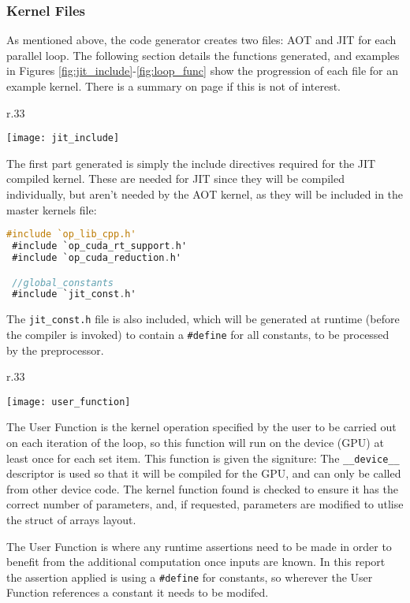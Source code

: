 \subsubsection{Kernel Files}
\label{ss:krnl_files}
As mentioned above, the code generator creates two files: AOT and JIT for each parallel loop. The following section details the functions generated, and examples in Figures \ref{fig:jit_include}-\ref{fig:loop_func} show the progression of each file for an example kernel. There is a summary on page \pageref{impl_summary} if this is not of interest.

%
\begin{wrapfigure}[10]{r}{.33\textwidth}
  \vspace{-2em}
  \centering
  \caption{JIT includes}
  \label{fig:jit_include}
  \texttt{[image: jit\_include]}
\end{wrapfigure}
The first part generated is simply the include directives required for the JIT compiled kernel. These are needed for JIT since they will be compiled individually, but aren't needed by the AOT kernel, as they will be included in the master kernels file:
\begin{lstlisting}[backgroundcolor = \color{green!20}, language=C]
 #include `op_lib_cpp.h'
 #include `op_cuda_rt_support.h'
 #include `op_cuda_reduction.h'

 //global_constants
 #include `jit_const.h'
\end{lstlisting}
The \verb|jit_const.h| file is also included, which will be generated at runtime (before the compiler is invoked) to contain a \verb|#define| for all constants, to be processed by the preprocessor.

\begin{wrapfigure}[12]{r}{.33\textwidth}
  \vspace{-2em}
  \centering
  \caption{User Function}
  \label{fig:usr_func}
  \texttt{[image: user\_function]}
\end{wrapfigure}
The User Function is the kernel operation specified by the user to be carried out on each iteration of the loop, so this function will run on the device (GPU) at least once for each set item. This function is given the signiture:
The \verb|__device__| descriptor is used so that it will be compiled for the GPU, and can only be called from other device code.
The kernel function found is checked to ensure it has the correct number of parameters, and, if requested, parameters are modified to utlise the struct of arrays layout.
\par
The User Function is where any runtime assertions need to be made in order to benefit from the additional computation once inputs are known. In this report the assertion applied is using a \verb|#define| for constants, so wherever the User Function references a constant it needs to be modifed.

